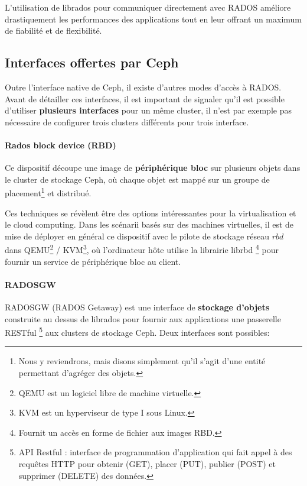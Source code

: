 L'utilisation de librados pour communiquer directement avec RADOS améliore drastiquement les performances des applications tout en leur offrant un maximum de fiabilité et de flexibilité.

\subsection{Interfaces offertes par Ceph}

Outre l'interface native de Ceph, il existe d'autres modes d'accès  à RADOS. Avant de détailler ces interfaces, il est important de signaler qu'il est possible d'utiliser \textbf{plusieurs interfaces} pour un même cluster, il n'est par exemple pas nécessaire de configurer trois clusters différents pour trois interface.

\paragraph{Rados block device (RBD)}

Ce dispositif découpe une image de \textbf{périphérique bloc} sur plusieurs objets dans le cluster de stockage Ceph, où chaque objet est mappé sur un groupe de placement\footnote{Nous y reviendrons, mais disons simplement qu'il s'agit d'une entité permettant d'agréger des objets.} et distribué.

Ces techniques se révèlent être des options intéressantes pour la virtualisation et le cloud computing. Dans les scénarii basés sur des machines virtuelles, il est de mise de déployer en général ce dispositif avec le pilote de stockage réseau $rbd$ dans QEMU\footnote{QEMU est un logiciel libre de machine virtuelle.} / KVM\footnote{KVM est un hyperviseur de type I sous Linux.}, où l'ordinateur hôte utilise la librairie librbd \footnote{Fournit un accès en forme de fichier aux images RBD.} pour fournir un service de périphérique bloc au client. 

\paragraph{RADOSGW}
RADOSGW (RADOS Getaway) est une interface de \textbf{stockage d'objets} construite au dessus de librados pour fournir aux applications une passerelle RESTful \footnote{API Restful : interface de programmation d'application qui fait appel à des requêtes HTTP pour obtenir (GET), placer (PUT), publier (POST) et supprimer (DELETE) des données.} aux clusters de stockage Ceph. Deux interfaces sont possibles:

